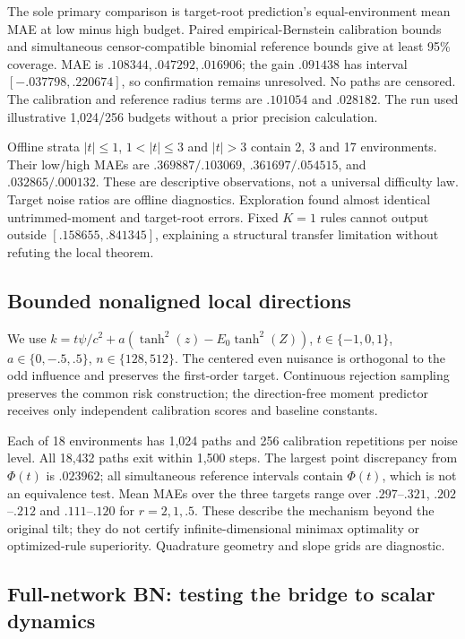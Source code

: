 The sole primary comparison is target-root prediction's equal-environment mean MAE at low minus high budget. Paired empirical-Bernstein calibration bounds and simultaneous censor-compatible binomial reference bounds give at least 95\% coverage. MAE is $.108344,.047292,.016906$; the gain $.091438$ has interval $[-.037798,.220674]$, so confirmation remains unresolved. No paths are censored. The calibration and reference radius terms are $.101054$ and $.028182$. The run used illustrative 1,024/256 budgets without a prior precision calculation.

Offline strata $|t|\le1$, $1<|t|\le3$ and $|t|>3$ contain 2, 3 and 17 environments. Their low/high MAEs are $.369887/.103069$, $.361697/.054515$, and $.032865/.000132$. These are descriptive observations, not a universal difficulty law. Target noise ratios are offline diagnostics. Exploration found almost identical untrimmed-moment and target-root errors. Fixed $K=1$ rules cannot output outside $[.158655,.841345]$, explaining a structural transfer limitation without refuting the local theorem.

\subsection{Bounded nonaligned local directions}
We use $k=t\psi/c^2+a(\tanh^2(z)-E_0\tanh^2(Z))$, $t\in\{-1,0,1\}$, $a\in\{0,-.5,.5\}$, $n\in\{128,512\}$. The centered even nuisance is orthogonal to the odd influence and preserves the first-order target. Continuous rejection sampling preserves the common risk construction; the direction-free moment predictor receives only independent calibration scores and baseline constants.

Each of 18 environments has 1,024 paths and 256 calibration repetitions per noise level. All 18,432 paths exit within 1,500 steps. The largest point discrepancy from $\Phi(t)$ is $.023962$; all simultaneous reference intervals contain $\Phi(t)$, which is not an equivalence test. Mean MAEs over the three targets range over $.297$--$.321$, $.202$--$.212$ and $.111$--$.120$ for $r=2,1,.5$. These describe the mechanism beyond the original tilt; they do not certify infinite-dimensional minimax optimality or optimized-rule superiority. Quadrature geometry and slope grids are diagnostic.

\subsection{Full-network BN: testing the bridge to scalar dynamics}
\label{full-network-bn-development-checks}

